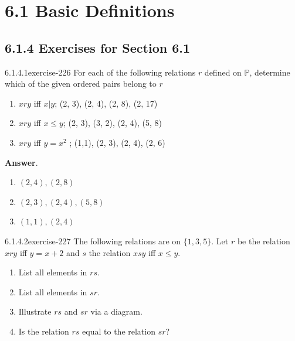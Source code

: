 \documentclass[twoside,10pt,]{book}
\numberwithin{equation}{section}
\begin{document}
\section*{6.1 Basic Definitions}
\subsection*{6.1.4 Exercises for Section 6.1}
\begin{divisionsolution}{6.1.4.1}{}{exercise-226}%
\hypertarget{p-1952}{}%
For each of the following relations \(r\) defined on \(\mathbb{P}\), determine which of the given ordered pairs belong to \(r\)%
\par
\hypertarget{p-1953}{}%
\leavevmode%
\begin{enumerate}[label=(\alph*)]
\item\hypertarget{li-1039}{}\hypertarget{p-1954}{}%
\(x r y\) iff \(x|y\);  (2, 3), (2, 4), (2, 8), (2, 17)%
\item\hypertarget{li-1040}{}\hypertarget{p-1955}{}%
\(x r y\) iff \(x \leq  y\); (2, 3), (3, 2), (2, 4), (5, 8)%
\item\hypertarget{li-1041}{}\hypertarget{p-1956}{}%
\(x r y\) iff \(y =x^2\) ; (1,1), (2, 3), (2, 4), (2, 6)%
\end{enumerate}
%
\par\smallskip%
\noindent\textbf{Answer}.\quad%
\hypertarget{p-1957}{}%
\leavevmode%
\begin{enumerate}[label=(\alph*)]
\item\hypertarget{li-1042}{}\hypertarget{p-1958}{}%
\((2,4), (2,8)\)%
\item\hypertarget{li-1043}{}\hypertarget{p-1959}{}%
\((2, 3), (2, 4), (5,8)\)%
\item\hypertarget{li-1044}{}\hypertarget{p-1960}{}%
\((1,1), (2,4)\)%
\end{enumerate}
%
\end{divisionsolution}%
\begin{divisionsolution}{6.1.4.2}{}{exercise-227}%
\hypertarget{p-1961}{}%
The following relations are on \(\{1, 3, 5\}\). Let \(r\) be the relation \(x r y\) iff \(y = x + 2\) and \(s\) the relation \(x s y\) iff \(x \leq  y\).%
\par
\hypertarget{p-1962}{}%
\leavevmode%
\begin{enumerate}[label=(\alph*)]
\item\hypertarget{li-1045}{}\hypertarget{p-1963}{}%
List all elements in  \(rs\).%
\item\hypertarget{li-1046}{}\hypertarget{p-1964}{}%
List all elements in  \(sr\).%
\item\hypertarget{li-1047}{}\hypertarget{p-1965}{}%
Illustrate \(rs\) and \(sr\) via a diagram.%
\item\hypertarget{li-1048}{}\hypertarget{p-1966}{}%
Is the relation \(rs\) equal to the relation \(sr\)?%
\end{enumerate}
%
\end{divisionsolution}%
\end{document}
